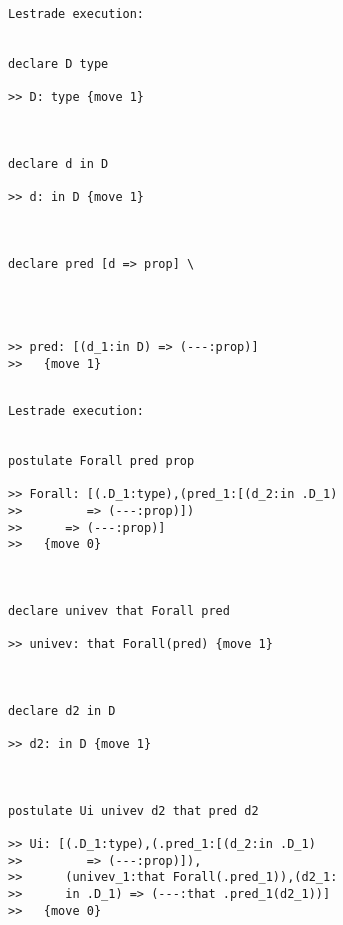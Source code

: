 \documentclass{slides}
\begin{document}
\begin{slide}
{\small
\begin{verbatim}Lestrade execution:


declare D type

>> D: type {move 1}



declare d in D

>> d: in D {move 1}



declare pred [d => prop] \
   



>> pred: [(d_1:in D) => (---:prop)]
>>   {move 1}


\end{verbatim}
}

\end{slide}

\begin{slide}

\begin{verbatim}Lestrade execution:


postulate Forall pred prop

>> Forall: [(.D_1:type),(pred_1:[(d_2:in .D_1)
>>         => (---:prop)])
>>      => (---:prop)]
>>   {move 0}



declare univev that Forall pred

>> univev: that Forall(pred) {move 1}



declare d2 in D

>> d2: in D {move 1}



postulate Ui univev d2 that pred d2

>> Ui: [(.D_1:type),(.pred_1:[(d_2:in .D_1)
>>         => (---:prop)]),
>>      (univev_1:that Forall(.pred_1)),(d2_1:
>>      in .D_1) => (---:that .pred_1(d2_1))]
>>   {move 0}


\end{verbatim}

\end{slide}
\end{document}
